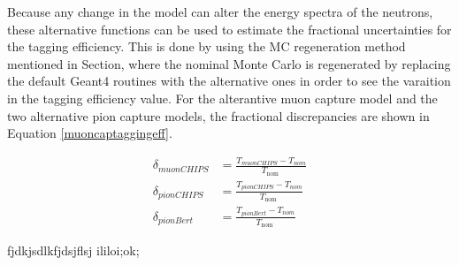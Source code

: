 Because any change in the model can alter the energy spectra of the neutrons, these alternative functions can be used to estimate the fractional uncertainties for the tagging efficiency. This is done by using the MC regeneration method mentioned in Section, where the nominal Monte Carlo is regenerated by replacing the default Geant4 routines with the alternative ones in order to see the varaition in the tagging efficiency value. For the alterantive muon capture model and the two alternative pion capture models, the fractional discrepancies are shown in Equation \ref{muoncaptaggingeff}.

\begin{equation}
    \begin{aligned}
        \delta_{muon C H I P S} &=\frac{T_{muon C H I P S}-T_{n o m}}{T_{\text {nom }}} \\
        \delta_{pion C H I P S} &=\frac{T_{pion C H I P S}-T_{n o m}}{T_{\text {nom }}} \\
        \delta_{pion B e r t} &=\frac{T_{pion B e r t}-T_{n o m}}{T_{\text {nom }}}
        \end{aligned}
        \label{muoncaptaggingeff}
\end{equation}

fjdkjsdlkfjdsjflsj
ililoi;ok;